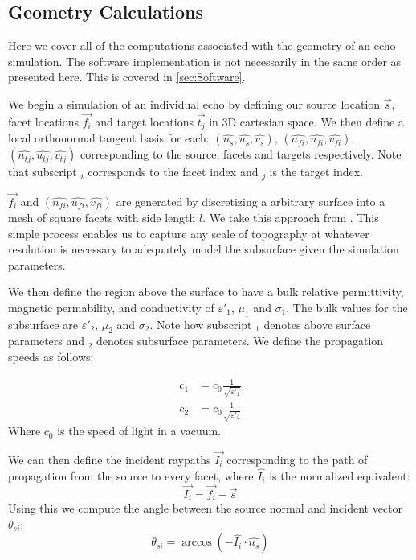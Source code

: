 \documentclass[lettersize,journal]{IEEEtran}
\begin{document}
\subsection{Geometry Calculations}

Here we cover all of the computations associated with the geometry of an echo simulation. The software implementation is not necessarily in the same order as presented here. This is covered in \ref{sec:Software}.

We begin a simulation of an individual echo by defining our source location $\vec{s}$, facet locations $\vec{f_i}$ and target locations $\vec{t_j}$ in 3D cartesian space. We then define a local orthonormal tangent basis for each: $(\hat{n_s}, \hat{u_s}, \hat{v_s})$, $(\hat{n_{fi}}, \hat{u_{fi}}, \hat{v_{fi}})$, $(\hat{n_{tj}}, \hat{u_{tj}}, \hat{v_{tj}})$ corresponding to the source, facets and targets respectively. Note that subscript $_i$ corresponds to the facet index and $_j$ is the target index. 

$\vec{f_i}$ and $(\hat{n_{fi}}, \hat{u_{fi}}, \hat{v_{fi}})$ are generated by discretizing a arbitrary surface into a mesh of square facets with side length $l$. We take this approach from \cite{nouvel_radar_2004}. This simple process enables us to capture any scale of topography at whatever resolution is necessary to adequately model the subsurface given the simulation parameters. 

We then define the region above the surface to have a bulk relative permittivity, magnetic permability, and conductivity of $\varepsilon'_1$, $\mu_1$ and $\sigma_1$. The bulk values for the subsurface are $\varepsilon'_2$, $\mu_2$ and $\sigma_2$. Note how subscript $_1$ denotes above surface parameters and $_2$ denotes subsurface parameters. We define the propagation speeds as follows:

\begin{align}
        c_1 &= c_0\frac{1}{\sqrt{\varepsilon'_1}} \\
        c_2 &= c_0\frac{1}{\sqrt{\varepsilon'_2}}
\end{align}
Where $c_0$ is the speed of light in a vacuum. 

We can then define the incident raypaths $\vec{I_{i}}$ corresponding to the path of propagation from the source to every facet, where $\hat{I_{i}}$ is the normalized equivalent:
\begin{equation}
    \vec{I_{i}}=\vec{f_i}-\vec{s}
\end{equation}
Using this we compute the angle between the source normal and incident vector $\theta_{si}$:
\begin{equation}
    \theta_{si} = \arccos\left(-\hat{I_{i}}\cdot\hat{n_s}\right)
\end{equation}
\end{document}
